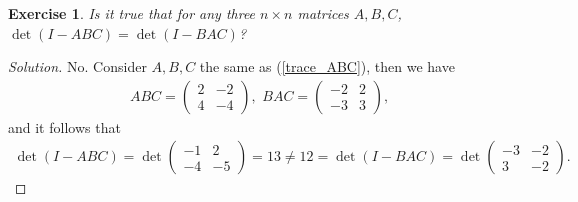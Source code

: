 \documentclass[11pt]{book}
\newtheorem{exercise}{Exercise}[section]
\theoremstyle{definition}
\numberwithin{equation}{chapter}
\begin{document}
\begin{exercise}
Is it true that for any three $n \times n$ matrices $A, B, C$, $\det (I - ABC) = \det (I - BAC)$?
\end{exercise}
\begin{proof}[Solution]
No. Consider $A, B, C$ the same as (\ref{trace_ABC}), then we have
\begin{align*}
    ABC = \begin{pmatrix}
        2 & -2 \\
        4 & -4
    \end{pmatrix}, \,\, BAC = \begin{pmatrix}
        -2 & 2 \\
        -3 & 3
    \end{pmatrix},
\end{align*}
and it follows that
\begin{align*}
    \det (I - ABC) = \det \begin{pmatrix}
        -1 & 2 \\
        -4 & -5
    \end{pmatrix} = 13 \neq 12 = \det (I - BAC) = \det \begin{pmatrix}
        -3 & -2 \\
        3 & -2
    \end{pmatrix}.
\end{align*}
\end{proof}

\medskip
\end{document}
